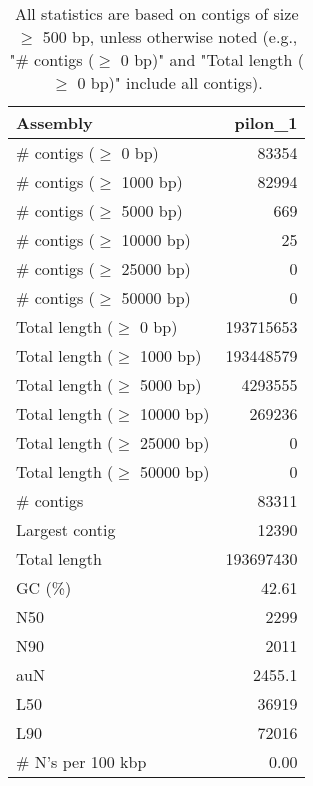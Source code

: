 \documentclass[12pt,a4paper]{article}
\begin{document}
\begin{table}[ht]
\begin{center}
\caption{All statistics are based on contigs of size $\geq$ 500 bp, unless otherwise noted (e.g., "\# contigs ($\geq$ 0 bp)" and "Total length ($\geq$ 0 bp)" include all contigs).}
\begin{tabular}{|l*{1}{|r}|}
\hline
Assembly & pilon\_1 \\ \hline
\# contigs ($\geq$ 0 bp) & 83354 \\ \hline
\# contigs ($\geq$ 1000 bp) & 82994 \\ \hline
\# contigs ($\geq$ 5000 bp) & 669 \\ \hline
\# contigs ($\geq$ 10000 bp) & 25 \\ \hline
\# contigs ($\geq$ 25000 bp) & 0 \\ \hline
\# contigs ($\geq$ 50000 bp) & 0 \\ \hline
Total length ($\geq$ 0 bp) & 193715653 \\ \hline
Total length ($\geq$ 1000 bp) & 193448579 \\ \hline
Total length ($\geq$ 5000 bp) & 4293555 \\ \hline
Total length ($\geq$ 10000 bp) & 269236 \\ \hline
Total length ($\geq$ 25000 bp) & 0 \\ \hline
Total length ($\geq$ 50000 bp) & 0 \\ \hline
\# contigs & 83311 \\ \hline
Largest contig & 12390 \\ \hline
Total length & 193697430 \\ \hline
GC (\%) & 42.61 \\ \hline
N50 & 2299 \\ \hline
N90 & 2011 \\ \hline
auN & 2455.1 \\ \hline
L50 & 36919 \\ \hline
L90 & 72016 \\ \hline
\# N's per 100 kbp & 0.00 \\ \hline
\end{tabular}
\end{center}
\end{table}
\end{document}
